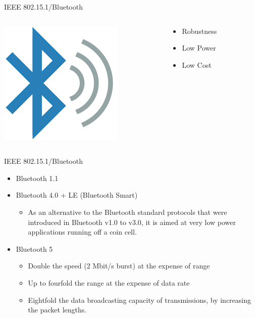 \documentclass[serif,Blue]{beamer}
\begin{document}
\begin{frame}{IEEE 802.15.1/Bluetooth}
	\begin{columns}
		\begin{column}{0.5\textwidth}
			\begin{center}
				\includegraphics[scale=0.4]{img/ble.png}
			\end{center}
		\end{column}
		\begin{column}{0.5\textwidth}
			\begin{itemize}\justifying{}
				\item Robustness
				\item Low Power
				\item Low Cost
			\end{itemize}
		\end{column}
	\end{columns}
\end{frame}

\begin{frame}{IEEE 802.15.1/Bluetooth}
	\begin{itemize}
		\item Bluetooth 1.1
		\item Bluetooth 4.0 + LE (Bluetooth Smart)
			\begin{itemize}\justifying{}
				\item As an alternative to the Bluetooth standard protocols that were introduced in Bluetooth v1.0 to v3.0, it is aimed at very low power applications running off a coin cell.
			\end{itemize}
		\item Bluetooth 5
			\begin{itemize}\justifying{}
				\item Double the speed (2 Mbit/s burst) at the expense of range
				\item Up to fourfold the range at the expense of data rate
				\item Eightfold the data broadcasting capacity of transmissions, by increasing the packet lengths.
			\end{itemize}
	\end{itemize}
\end{frame}
\end{document}

